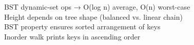 \documentclass[preview]{standalone}
\begin{document}
BST dynamic-set ops → O(log n) average, O(n) worst-case\\Height depends on tree shape (balanced vs. linear chain)\\BST property ensures sorted arrangement of keys\\Inorder walk prints keys in ascending order\\
\end{document}
